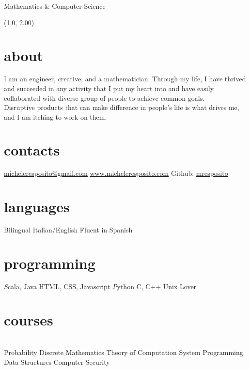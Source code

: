 \documentclass[]{mre-cv}
\begin{document}
       {Mathematics \& Computer Science}
\begin{textblock}{18.6}(1.0, 2.00)
\section{about} %
I am an engineer, creative, and a mathematician. Through my life, I have thrived and succeeded in any activity that I put my heart into and have easily collaborated with diverse group of people to achieve common goals.\\
Disruptive products that can make difference in people's life is what drives me, and I am itching to work on them.\\
\end{textblock}
\begin{aside}
  \section{contacts}
    \href{mailto:micheleresposito@gmail.com}{\underline{micheleresposito@gmail.com}}
    \href{http://www.micheleresposito.com}{\underline{www.micheleresposito.com}}
    Github: \href{https://github.com/mresposito}{\underline{mresposito}}
    \vspace{.25cm}
  \section{languages}
    Bilingual Italian/English
    Fluent in Spanish 

  \section{programming}
    {\emph Scala, Java}
    HTML, CSS, Javascript
    {\emph Python }
    C, C++
    Unix Lover
    \vspace{0.62cm}
  \section{courses}\\ %
    Probability
    Discrete Mathematics
    Theory of Computation
    System Programming
    Data Structures
    Computer Security
    \vspace{2.25cm}
 
\end{aside}

\end{document}
